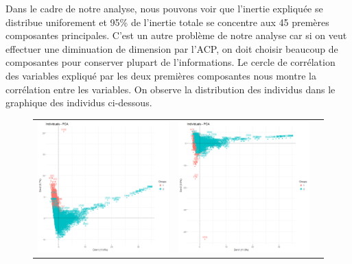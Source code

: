 \documentclass[a4paper,11pt,oneside,roman]{article}
\begin{document}
Dans le cadre de notre analyse, nous pouvons voir que l'inertie expliquée se distribue uniforement et 95\% de l'inertie totale se concentre aux 45 premères composantes principales. C'est un autre problème de notre analyse car si on veut effectuer une diminuation de dimension par l'ACP, on doit choisir beaucoup de composantes pour conserver plupart de l'informations. Le cercle de corrélation des variables expliqué par les deux premières composantes nous montre la corrélation entre les variables. On observe la distribution des individus dans le graphique des individus ci-dessous. 
\begin{figure}[htb]
    \centering
    \begin{tabular}{ccc}
    \includegraphics[scale = .3]{./discrimination/spambase/indi_plot12.png} &
    \includegraphics[scale = .3]{./discrimination/spambase/indi_plot13.png} 

\end{tabular}
\end{figure}
\end{document}
